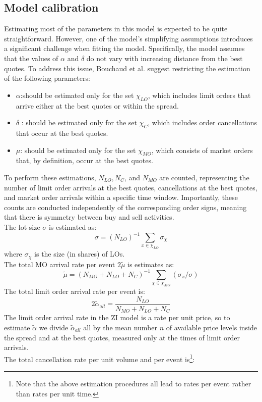 \subsection{Model calibration}
Estimating most of the parameters in this model is expected to be quite straightforward. However, one of the model's simplifying assumptions introduces a significant challenge when fitting the model. Specifically, the model assumes that the values of $\alpha$ and $\delta$ do not vary with increasing distance from the best quotes.
To address this issue, Bouchaud et al. suggest restricting the estimation of the following parameters:
\begin{itemize}
\item $\alpha$:should be estimated only for the set $\chi_{LO}$, which includes limit orders that arrive either at the best quotes or within the spread.
\item $\delta$ : should be estimated only for the set $\chi_C$, which includes order cancellations that occur at the best quotes.
\item $\mu$:  should be estimated only for the set $\chi_{MO}$, which consists of market orders that, by definition, occur at the best quotes.
\end{itemize}
To perform these estimations, $N_{LO}, N_{C}$, and $N_{MO}$ are counted, representing the number of limit order arrivals at the best quotes, cancellations at the best quotes, and market order arrivals within a specific time window. Importantly, these counts are conducted independently of the corresponding order signs, meaning that there is symmetry between buy and sell activities.\\
The lot size $\sigma$ is estimated as:
\[
\sigma = (N_{LO})^{-1} \sum_{x \in \chi_{LO}} \sigma_{\chi}
\]
where $\sigma_{\chi}$ is the size (in shares) of LOs.\\
The total MO arrival rate per event $2\tilde{\mu}$ is estimates as:
\[
\tilde{\mu} = (N_{MO} + N_{LO} + N_C)^{-1} \sum_{\chi \in \chi_{MO}} (\sigma_x/\sigma)
\]
The total limit order arrival rate per event is:
\[
2\tilde{\alpha}_{all} = \frac{N_{LO}}{N_{MO} + N_{LO} + N_{C}}
\]
The limit order arrival rate in the ZI model is a rate per unit price, so to estimate $\tilde{\alpha}$
we divide $\tilde{\alpha}_{all}$ all by the mean number $n$ of available price levels inside the spread and
at the best quotes, measured only at the times of limit order arrivals.\\
The total cancellation rate per unit volume and per event is\footnote{Note that the above estimation procedures all lead to rates per event rather than rates per unit time.}:
